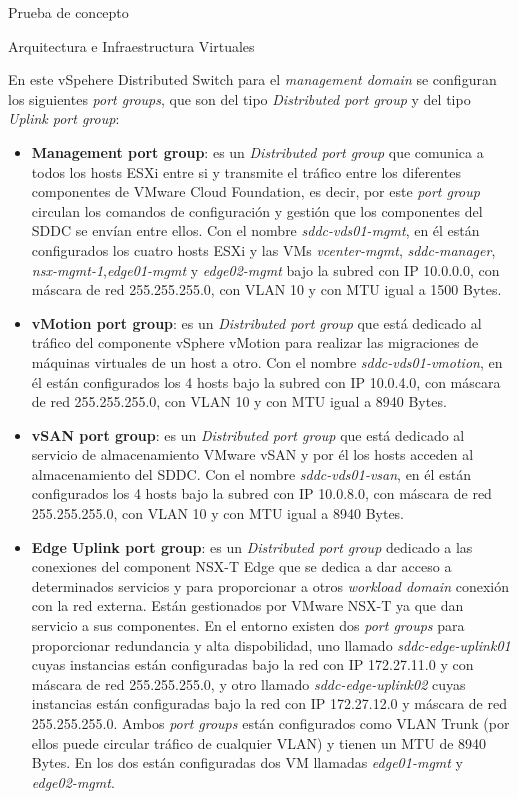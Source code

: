 \begin{section}{Prueba de concepto}
\begin{subsection}{Arquitectura e Infraestructura Virtuales\cite{CFVirtInfraes}}
\begin{itemize}
\end{itemize}
En este vSpehere Distributed Switch para el \textit{management domain} se configuran los siguientes \textit{port groups}, que son del tipo \textit{Distributed port group} y del tipo \textit{Uplink port group}:
\begin{itemize}
       
        \item \textbf{Management port group}: es un \textit{Distributed port group} que comunica a todos los hosts ESXi entre si y transmite el tráfico entre los diferentes componentes de VMware Cloud Foundation, es decir, por este \textit{port group} circulan los comandos de configuración y gestión que los componentes del SDDC se envían entre ellos. Con el nombre \textit{sddc-vds01-mgmt}, en él están configurados los cuatro hosts ESXi y las VMs \textit{vcenter-mgmt}, \textit{sddc-manager}, \textit{nsx-mgmt-1},\textit{edge01-mgmt} y \textit{edge02-mgmt} bajo la subred con IP 10.0.0.0, con máscara de red 255.255.255.0, con VLAN 10 y con MTU igual a 1500 Bytes.
        
        \item \textbf{vMotion port group}: es un \textit{Distributed port group} que está dedicado al tráfico del componente vSphere vMotion para realizar las migraciones de máquinas virtuales de un host a otro. Con el nombre \textit{sddc-vds01-vmotion}, en él están configurados los 4 hosts bajo la subred con IP 10.0.4.0, con máscara de red 255.255.255.0, con VLAN 10 y con MTU igual a 8940 Bytes.
        
        \item \textbf{vSAN port group}: es un \textit{Distributed port group} que está dedicado al servicio de almacenamiento VMware vSAN y por él los hosts acceden al almacenamiento del SDDC. Con el nombre \textit{sddc-vds01-vsan}, en él están configurados los 4 hosts bajo la subred con IP 10.0.8.0, con máscara de red 255.255.255.0, con VLAN 10 y con MTU igual a 8940 Bytes.
        
        \item \textbf{Edge Uplink port group}: es un \textit{Distributed port group} dedicado a las conexiones del component NSX-T Edge que se dedica a dar acceso a determinados servicios y para proporcionar a otros \textit{workload domain} conexión con la red externa. Están gestionados por VMware NSX-T ya que dan servicio a sus componentes. En el entorno existen dos \textit{port groups} para proporcionar redundancia y alta dispobilidad, uno llamado \textit{sddc-edge-uplink01} cuyas instancias están configuradas bajo la red con IP 172.27.11.0 y con máscara de red 255.255.255.0, y otro llamado \textit{sddc-edge-uplink02} cuyas instancias están configuradas bajo la red con IP 172.27.12.0 y máscara de red 255.255.255.0. Ambos \textit{port groups} están configurados como VLAN Trunk (por ellos puede circular tráfico de cualquier VLAN) y tienen un MTU de 8940 Bytes. En los dos están configuradas dos VM llamadas \textit{edge01-mgmt} y \textit{edge02-mgmt}.
        

\end{itemize}
\end{subsection}
\end{section}
